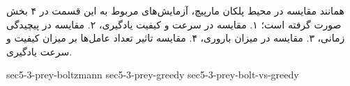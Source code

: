 همانند مقایسه در محیط پلکان مارپیچ، آزمایش‌های مربوط به این قسمت در ۴ بخش صورت گرفته است؛ ۱. مقایسه در سرعت و کیفیت یادگیری، ۲. مقایسه در پیچیدگی زمانی، ۳. مقایسه در میزان باروری، ۴. مقایسه تاثیر تعداد عامل‌ها بر میزان کیفیت و سرعت یادگیری.

{sec5-3-prey-boltzmann}
{sec5-3-prey-greedy}
{sec5-3-prey-bolt-vs-greedy}